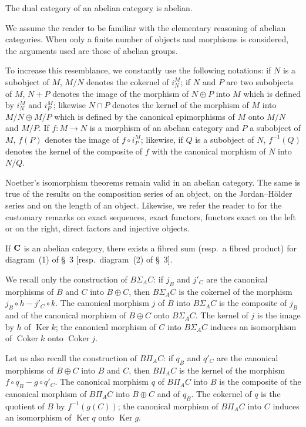 The dual category of an abelian category is abelian.

We assume the reader to be familiar with the elementary reasoning of abelian
categories. When only a finite number of objects and morphisms is considered,
the arguments used are those of abelian groups.

To increase this resemblance, we constantly use the following notations: if
$N$ is a subobject of $M$, $M/N$ denotes the cokernel of $i_N^M$; if $N$ and
$P$ are two subobjects of $M$, $N + P$ denotes the image of the morphism of
$N \oplus P$ into $M$ which is defined by $i_N^M$ and $i_P^M$; likewise
$N \cap P$ denotes the kernel of the morphism of $M$ into $M/N \oplus M/P$
which is defined by the canonical epimorphisms of $M$ onto $M/N$ and $M/P$.
If $f\colon M\to N$ is a morphism of an abelian category and $P$ a subobject
of $M$, $f(P)$ denotes the image of $f\circ i_P^M$; likewise, if $Q$ is a
subobject of $N$, $f^{-1}(Q)$ denotes the kernel of the composite of $f$
with the canonical morphism of $N$ into $N/Q$.

Noether's isomorphism theorems remain valid in an abelian category. The same
is true of the results on the composition series of an object, on the
Jordan--Hölder series and on the length of an object. Likewise, we refer the
reader to \cite{cartan-eilenberg} for the customary remarks on exact sequences, exact functors,
functors exact on the left or on the right, direct factors and injective
objects.

\begin{proposition}
If $\mathbf{C}$ is an abelian category, there exists a fibred sum (resp.\ a fibred
product) for diagram~(1) of \S~3 [resp.\ diagram~(2) of \S~3].
\end{proposition}

We recall only the construction of $B\Sigma_A C$: if $j_B$ and $j'_C$ are the
canonical morphisms of $B$ and $C$ into $B \oplus C$, then $B\Sigma_A C$ is
the cokernel of the morphism $j_B\circ h - j'_C\circ k$. The canonical
morphism $j$ of $B$ into $B\Sigma_A C$ is the composite of $j_B$ and of the
canonical morphism of $B \oplus C$ onto $B\Sigma_A C$. The kernel of $j$ is
the image by $h$ of $\operatorname{Ker} k$; the canonical morphism of $C$
into $B\Sigma_A C$ induces an isomorphism of $\operatorname{Coker} k$ onto
$\operatorname{Coker} j$.

Let us also recall the construction of $B\Pi_A C$: if $q_B$ and $q'_C$ are the
canonical morphisms of $B \oplus C$ into $B$ and $C$, then $B\Pi_A C$ is the
kernel of the morphism $f\circ q_B - g\circ q'_C$. The canonical morphism $q$
of $B\Pi_A C$ into $B$ is the composite of the canonical morphism of
$B\Pi_A C$ into $B \oplus C$ and of $q_B$. The cokernel of $q$ is the
quotient of $B$ by $f^{-1}(g(C))$; the canonical morphism of $B\Pi_A C$ into
$C$ induces an isomorphism of $\operatorname{Ker} q$ onto $\operatorname{Ker} g$.